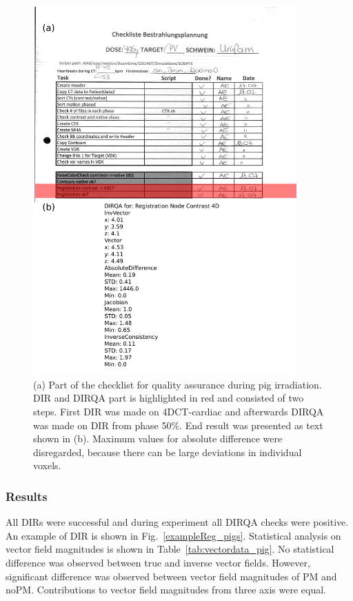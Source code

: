 \documentclass[type=dr, dr=rernat, accentcolor=tud7b,colorbacktitle, bigchapter, openright, twoside, 12pt ]{tudthesis}
\begin{document}
\newpage
\begin{figure}[H]
	\begin{center}		
		\includegraphics[width=0.9\textwidth]{./Images/checkList.png}
		\caption{(a) Part of the checklist for quality assurance during pig irradiation. DIR and DIRQA part is highlighted in red and consisted of two steps. First DIR was made on 4DCT-cardiac and afterwards DIRQA was made on
		DIR from phase 50\%. End result was presented as text shown in (b). Maximum values for absolute difference were disregarded, because there can be large deviations in individual voxels.}
		\label{checkList}
	\end{center}
\end{figure}
\newpage

\subsubsection{Results}


All DIRs were successful and during experiment all DIRQA checks were positive. An example of DIR is shown in Fig.~\ref{exampleReg_pigs}. Statistical analysis on vector field magnitudes is shown in Table~\ref{tab:vectordata_pig}. No statistical difference was
observed between true and inverse vector fields. However, significant difference was observed between vector field magnitudes of PM and noPM. Contributions to vector field magnitudes from three axis were equal. 
\end{document}
